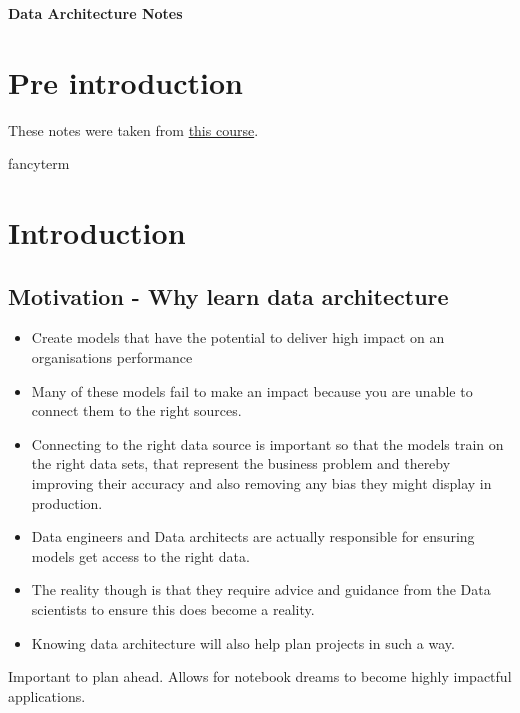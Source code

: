 \documentclass[a4paper, 11pt]{article}
\begin{document}
    \begin{titlepage}
        \centering
        \vspace*{2in}
        \Huge \textbf{Data Architecture Notes}
    \end{titlepage}

    \setcounter{section}{0}

    \newpage

    \tableofcontents
    \newpage

    \listoffigures
    \newpage


    \section{Pre introduction}
    These notes were taken from \href{https://www.udemy.com/course/data-architecture-for-data-scientists}{this course}.


    \gls{fancyterm}


    \section{Introduction}
    \subsection{Motivation - Why learn data architecture}
    \begin{itemize}
        \item Create models that have the potential to deliver high impact on an organisations performance
        \item Many of these models fail to make an impact because you are unable to connect them to the right sources.
        \item Connecting to the right data source is important so that the models train on the right data sets, that represent the business problem and thereby improving their accuracy and also removing any bias they might display in production.
        \item Data engineers and Data architects are actually responsible for ensuring models get access to the right data.
        \item The reality though is that they require advice and guidance from the Data scientists to ensure this does become a reality.
        \item Knowing data architecture will also help plan projects in such a way.
    \end{itemize}
    Important to plan ahead.
    Allows for notebook dreams to become highly impactful applications.
\end{document}
